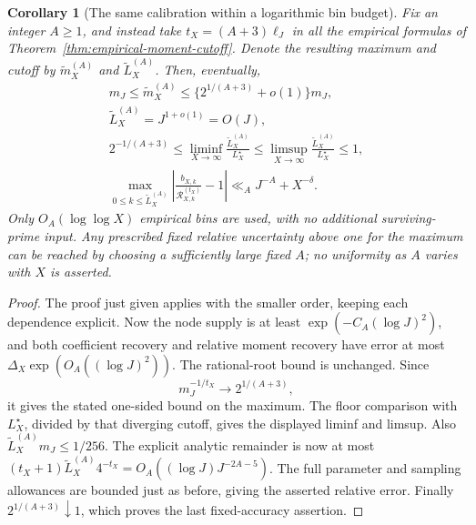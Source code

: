 \documentclass[11pt]{article}
\newtheorem{corollary}[theorem]{Corollary}
\theoremstyle{definition}
\begin{document}
\begin{corollary}[The same calibration within a logarithmic bin budget]
\label{cor:empirical-cutoff-logarithmic-budget}
Fix an integer $A\ge1$, and instead take
$t_X=(A+3)\ell_J$ in all the empirical formulas of
Theorem~\ref{thm:empirical-moment-cutoff}.
Denote the resulting maximum and cutoff by
$\widetilde m_X^{(A)}$ and $\widetilde L_X^{(A)}$.
Then, eventually,
\begin{equation}
 \begin{gathered}
 m_J\le\widetilde m_X^{(A)}
       \le\{2^{1/(A+3)}+o(1)\}m_J,\\
            \widetilde L_X^{(A)}=J^{1+o(1)}=O(J),\\
 2^{-1/(A+3)}
       \le\liminf_{X\to\infty}
           \frac{\widetilde L_X^{(A)}}{L_X^\star}
       \le\limsup_{X\to\infty}
           \frac{\widetilde L_X^{(A)}}{L_X^\star}\le1,\\
 \max_{0\le k\le\widetilde L_X^{(A)}}
 \left|\frac{b_{X,k}}{\mathcal R^{(t_X)}_{X,k}}-1\right|
                          \ll_A J^{-A}+X^{-\delta}.
 \end{gathered}
 \label{eq:empirical-cutoff-logarithmic-version}
\end{equation}
Only $O_A(\log\log X)$ empirical bins are used, with no
additional surviving-prime input.
Any prescribed fixed relative uncertainty above one for the
maximum can be reached by choosing a sufficiently large fixed
$A$; no uniformity as $A$ varies with $X$ is asserted.
\end{corollary}

\begin{proof}
The proof just given applies with the smaller order, keeping
each dependence explicit.
Now the node supply is at least
$\exp(-C_A(\log J)^2)$, and both coefficient recovery and
relative moment recovery have error at most
$\Delta_X\exp(O_A((\log J)^2))$.
The rational-root bound is unchanged.
Since
\[
 m_J^{-1/t_X}\longrightarrow2^{1/(A+3)},
\]
it gives the stated one-sided bound on the maximum.
The floor comparison with $L_X^\star$, divided by that
diverging cutoff, gives the displayed liminf and limsup.
Also $\widetilde L_X^{(A)}m_J\le1/256$.
The explicit analytic remainder is now at most
$(t_X+1)\widetilde L_X^{(A)}4^{-t_X}
 =O_A((\log J)J^{-2A-5})$.
The full parameter and sampling allowances are bounded just
as before, giving the asserted relative error.
Finally $2^{1/(A+3)}\downarrow1$, which proves the last
fixed-accuracy assertion.
\end{proof}
\end{document}
